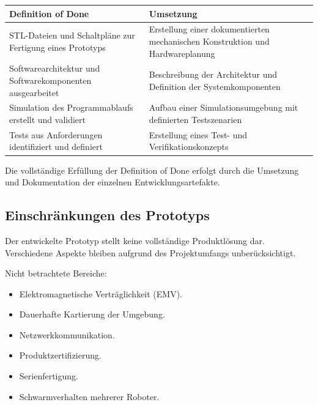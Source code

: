 \begin{longtable}[]{@{}
  >{\raggedright\arraybackslash}p{}
  >{\raggedright\arraybackslash}p{}@{}}
\toprule\noalign{}
\begin{minipage}[b]{\linewidth}\raggedright
Definition of Done
\end{minipage} & \begin{minipage}[b]{\linewidth}\raggedright
Umsetzung
\end{minipage} \\
\midrule\noalign{}
\endhead
\bottomrule\noalign{}
\endlastfoot
STL-Dateien und Schaltpläne zur Fertigung eines Prototyps & Erstellung
einer dokumentierten mechanischen Konstruktion und Hardwareplanung \\
Softwarearchitektur und Softwarekomponenten ausgearbeitet & Beschreibung
der Architektur und Definition der Systemkomponenten \\
Simulation des Programmablaufs erstellt und validiert & Aufbau einer
Simulationsumgebung mit definierten Testszenarien \\
Tests aus Anforderungen identifiziert und definiert & Erstellung eines
Test- und Verifikationskonzepts \\
\end{longtable}

Die vollständige Erfüllung der Definition of Done erfolgt durch die
Umsetzung und Dokumentation der einzelnen Entwicklungsartefakte.

\subsection{Einschränkungen des
Prototyps}\label{einschruxe4nkungen-des-prototyps}

Der entwickelte Prototyp stellt keine vollständige Produktlösung dar.
Verschiedene Aspekte bleiben aufgrund des Projektumfangs
unberücksichtigt.

Nicht betrachtete Bereiche:

\begin{itemize}
\tightlist
\item
  Elektromagnetische Verträglichkeit (EMV).
\item
  Dauerhafte Kartierung der Umgebung.
\item
  Netzwerkkommunikation.
\item
  Produktzertifizierung.
\item
  Serienfertigung.
\item
  Schwarmverhalten mehrerer Roboter.
\end{itemize}

